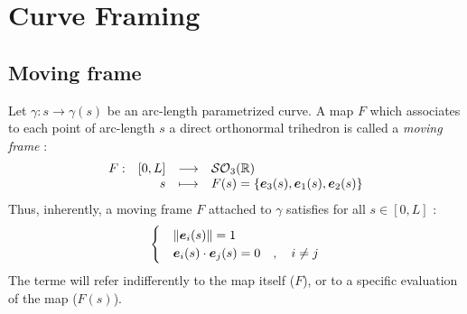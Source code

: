 



\section{Curve Framing}

\subsection{Moving frame}

Let $\gamma : s \rightarrow \gamma(s)$ be an arc-length parametrized curve. A map $F$ which associates to each point of arc-length $s$ a direct orthonormal trihedron is called a \emph{moving frame} :
\begin{equation}
	\begin{array}{lrcl} F: & [0,L] & \longrightarrow & \mathcal{SO}_{3}(\mathbb{R}) \\ & s & \longmapsto & F(s) = \{\boldsymbol{e}_{3}(s),\boldsymbol{e}_{1}(s),\boldsymbol{e}_{2}(s)\} \end{array}
\end{equation}
Thus, inherently, a moving frame $F$ attached to $\gamma$ satisfies for all $s \in [0,L]$ :
\begin{equation}
\begin{cases}
&\| \boldsymbol{e}_i(s) \| = 1 \\
&\boldsymbol{e}_i(s) \cdot \boldsymbol{e}_j(s) = 0\quad , \quad i \neq j
\end{cases}
\end{equation}
The terme  will refer indifferently to the map itself ($F$), or to a specific evaluation of the map ($F(s)$).

